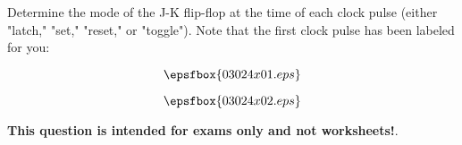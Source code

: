 

Determine the mode of the J-K flip-flop at the time of each clock pulse (either "latch," "set," "reset," or "toggle").  Note that the first clock pulse has been labeled for you:

$$\epsfbox{03024x01.eps}$$







$$\epsfbox{03024x02.eps}$$







{\bf This question is intended for exams only and not worksheets!}.




